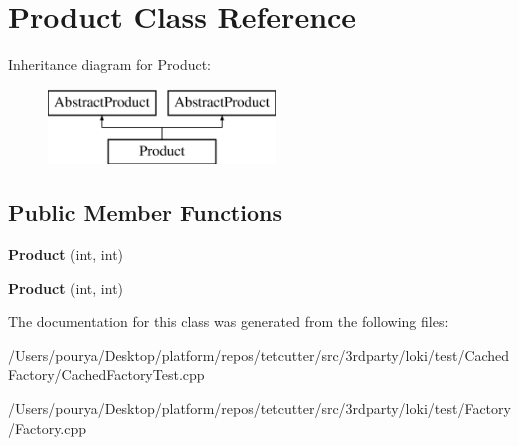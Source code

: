 \hypertarget{classProduct}{}\section{Product Class Reference}
\label{classProduct}
Inheritance diagram for Product\+:\begin{figure}[H]
\begin{center}
\leavevmode
\includegraphics[height=2.000000cm]{classProduct}
\end{center}
\end{figure}
\subsection*{Public Member Functions}
\begin{DoxyCompactItemize}
\item 
\hypertarget{classProduct_acb17460132c471811a4fb9afb324b6c4}{}{\bfseries Product} (int, int)\label{classProduct_acb17460132c471811a4fb9afb324b6c4}

\item 
\hypertarget{classProduct_acb17460132c471811a4fb9afb324b6c4}{}{\bfseries Product} (int, int)\label{classProduct_acb17460132c471811a4fb9afb324b6c4}

\end{DoxyCompactItemize}


The documentation for this class was generated from the following files\+:\begin{DoxyCompactItemize}
\item 
/\+Users/pourya/\+Desktop/platform/repos/tetcutter/src/3rdparty/loki/test/\+Cached\+Factory/Cached\+Factory\+Test.\+cpp\item 
/\+Users/pourya/\+Desktop/platform/repos/tetcutter/src/3rdparty/loki/test/\+Factory/Factory.\+cpp\end{DoxyCompactItemize}
